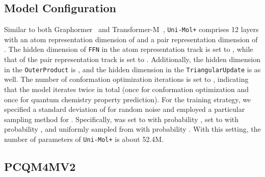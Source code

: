 \documentclass{article}
\newcommand{\name}{\texttt{Uni-Mol+}\xspace}
\newcommand{\opm}{\texttt{OuterProduct}\xspace}
\newcommand{\tm}{\texttt{TriangularUpdate}\xspace}
\newcommand{\ffn}{\texttt{FFN}\xspace}
\begin{document}
\subsection{Model Configuration}

Similar to both Graphormer~\cite{ying2021transformers} and Transformer-M~\cite{luo2022one}, \name comprises 12 layers with an atom representation dimension of  and a pair representation dimension of . 
The hidden dimension of \ffn in the atom representation track is set to , while that of the pair representation track is set to . Additionally, the hidden dimension in the \opm is , and the hidden dimension in the \tm is  as well. The number of conformation optimization iterations  is set to , indicating that the model iterates twice in total (once for conformation optimization and once for quantum chemistry property prediction).
For the training strategy, we specified a standard deviation of  for random noise and employed a particular sampling method for . Specifically,  was set to  with probability , set to  with probability , and uniformly sampled from  with probability . 
With this setting, the number of parameters of \name is about 52.4M. 


\subsection{PCQM4MV2}
\end{document}
